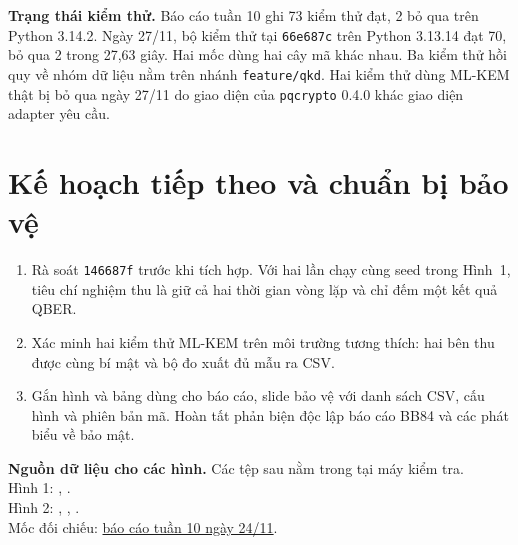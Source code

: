 \documentclass[11pt,a4paper]{article}
\begin{document}
\textbf{Trạng thái kiểm thử.} Báo cáo tuần 10 ghi 73 kiểm thử đạt, 2 bỏ qua trên Python 3.14.2. Ngày 27/11, bộ kiểm thử tại \texttt{66e687c} trên Python 3.13.14 đạt 70, bỏ qua 2 trong 27,63 giây. Hai mốc dùng hai cây mã khác nhau. Ba kiểm thử hồi quy về nhóm dữ liệu nằm trên nhánh \texttt{feature/qkd}. Hai kiểm thử dùng ML-KEM thật bị bỏ qua ngày 27/11 do giao diện của \texttt{pqcrypto} 0.4.0 khác giao diện adapter yêu cầu.

\section{Kế hoạch tiếp theo và chuẩn bị bảo vệ}
\begin{enumerate}
\item Rà soát \texttt{146687f} trước khi tích hợp. Với hai lần chạy cùng seed trong Hình~1, tiêu chí nghiệm thu là giữ cả hai thời gian vòng lặp và chỉ đếm một kết quả QBER.
\item Xác minh hai kiểm thử ML-KEM trên môi trường tương thích: hai bên thu được cùng bí mật và bộ đo xuất đủ mẫu ra CSV.
\item Gắn hình và bảng dùng cho báo cáo, slide bảo vệ với danh sách CSV, cấu hình và phiên bản mã. Hoàn tất phản biện độc lập báo cáo BB84 và các phát biểu về bảo mật.
\end{enumerate}

{\small\textbf{Nguồn dữ liệu cho các hình.} Các tệp sau nằm trong  tại máy kiểm tra.\\
Hình 1: , .\\
Hình 2: , , .\\
Mốc đối chiếu: \href{https://github.com/Duc-HUST-ET1/QKD_vs_PQC/blob/146687f/reports/PROGRESS_REPORT_2026-11-24.md}{báo cáo tuần 10 ngày 24/11}.}
\end{document}
